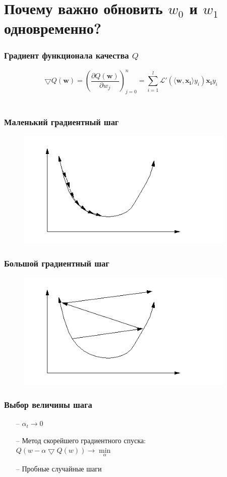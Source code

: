 \documentclass[10pt]{beamer}
\begin{document}
\section{Почему важно обновить $w_0$ и $w_1$ одновременно?}

\begin{frame}\frametitle{Градиент функционала качества $Q$}
	$$\bigtriangledown Q(\mathbf{w}) = (\frac{\partial Q(\mathbf{w})}{\partial w_j})_{j=0}^n = \sum\limits_{i=1}^l \mathcal{L}'(\langle \mathbf{w}, \mathbf{x_i} \rangle y_i) \mathbf{x_i} y_i$$\\
\end{frame}

\begin{frame}\frametitle{Маленький градиентный шаг}
	\begin{figure}[htbp]
	  \includegraphics[height=160pt, keepaspectratio = true]{images/learning_rate_small}
	\end{figure}
\end{frame}

\begin{frame}\frametitle{Большой градиентный шаг}
	\begin{figure}[htbp]
	  \includegraphics[height=160pt, keepaspectratio = true]{images/learning_rate_large}
	\end{figure}
\end{frame}

\begin{frame}\frametitle{Выбор величины шага}
	\begin{itemize}
		\item[--] $\alpha_t \rightarrow 0$\\
		\item[--] Метод скорейшего градиентного спуска:\\
		$Q(w - \alpha \bigtriangledown Q(w)) \rightarrow \min\limits_{\alpha}$
		\item[--] Пробные случайные шаги
	\end{itemize}
\end{frame}
\end{document}
